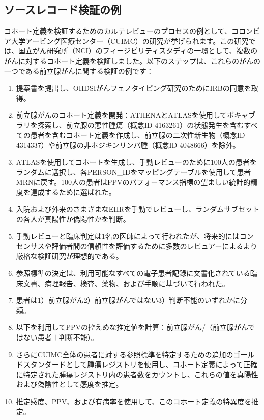 \documentclass[
  11pt]{book}
\providecommand{\tightlist}{%
  \setlength{\itemsep}{0pt}\setlength{\parskip}{0pt}}
\theoremstyle{definition}
\theoremstyle{definition}
\theoremstyle{definition}
\theoremstyle{definition}
\theoremstyle{remark}
\begin{document}
\subsection{ソースレコード検証の例}\label{ux30bdux30fcux30b9ux30ecux30b3ux30fcux30c9ux691cux8a3cux306eux4f8b}

コホート定義を検証するためのカルテレビューのプロセスの例として、コロンビア大学アービング医療センター（CUIMC）の研究が挙げられます。この研究では、国立がん研究所（NCI）のフィージビリティスタディの一環として、複数のがんに対するコホート定義を検証しました。以下のステップは、これらのがんの一つである前立腺がんに関する検証の例です：

\begin{enumerate}
\def\labelenumi{\arabic{enumi}.}
\tightlist
\item
  提案書を提出し、OHDSIがんフェノタイピング研究のためにIRBの同意を取得。
\item
  前立腺がんのコホート定義を開発：ATHENAとATLASを使用してボキャブラリを探索し、前立腺の悪性腫瘍（概念ID 4163261）の状態発生を含むすべての患者を含むコホート定義を作成し、前立腺の二次性新生物（概念ID 4314337）や前立腺の非ホジキンリンパ腫（概念ID 4048666）を除外。
\item
  ATLASを使用してコホートを生成し、手動レビューのために100人の患者をランダムに選択し、各PERSON\_IDをマッピングテーブルを使用して患者MRNに戻す。100人の患者はPPVのパフォーマンス指標の望ましい統計的精度を達成するために選ばれた。
\item
  入院および外来のさまざまなEHRを手動でレビューし、ランダムサブセットの各人が真陽性か偽陽性かを判断。
\item
  手動レビューと臨床判定は1名の医師によって行われたが、将来的にはコンセンサスや評価者間の信頼性を評価するために多数のレビュアーによるより厳格な検証研究が理想的である。
\item
  参照標準の決定は、利用可能なすべての電子患者記録に文書化されている臨床文書、病理報告、検査、薬物、および手顺に基づいて行われた。
\item
  患者は1）前立腺がん2）前立腺がんではない3）判断不能のいずれかに分類。
\item
  以下を利用してPPVの控えめな推定値を計算：前立腺がん/（前立腺がんではない患者＋判断不能）。
\item
  さらにCUIMC全体の患者に対する参照標準を特定するための追加のゴールドスタンダードとして腫瘍レジストリを使用し、コホート定義によって正確に特定された腫瘍レジストリ内の患者数をカウントし、これらの値を真陽性および偽陰性として感度を推定。
\item
  推定感度、PPV、および有病率を使用して、このコホート定義の特異度を推定。
\end{enumerate}
\end{document}

